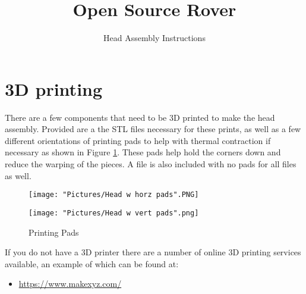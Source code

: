 \documentclass[12pt]{article}
\begin{document}
\title{Open Source Rover}
\author{Head Assembly Instructions}

\makeatletter         
\def\@maketitle{
\begin{center}	
	\makebox[\textwidth][c]{ \texttt{[image: "Pictures/Head final".png]}}
	{\Huge \bfseries \sffamily \@title }\\[4ex] 
	{\huge \bfseries \sffamily \@author}\\[4ex] 
	\texttt{[image: "Pictures/JPL logo".png]}
\end{center}}
\makeatother

\maketitle

\newpage


\tableofcontents

\newpage

\section{3D printing}
There are a few components that need to be 3D printed to make the head assembly. Provided are a the STL files necessary for these prints, as well as a few different orientations of printing pads to help with thermal contraction if necessary as shown in Figure \ref{pads}. These pads help hold the corners down and reduce the warping of the pieces. A file is also included with no pads for all files as well. 

\begin{figure}[H]
  \centering
  \begin{minipage}[b]{0.45\textwidth}
    \texttt{[image: "Pictures/Head w horz pads".PNG]}
  \end{minipage}
  \hfill
  \begin{minipage}[b]{0.45\textwidth}
    \texttt{[image: "Pictures/Head w vert pads".png]}
  \end{minipage}
  \caption{Printing Pads}
  \label{pads}
\end{figure}

If you do not have a 3D printer there are a number of online 3D printing services available, an example of which can be found at:

\begin{itemize}
	\item \href{https://www.makexyz.com/}{https://www.makexyz.com/}
\end{itemize}
\end{document}

